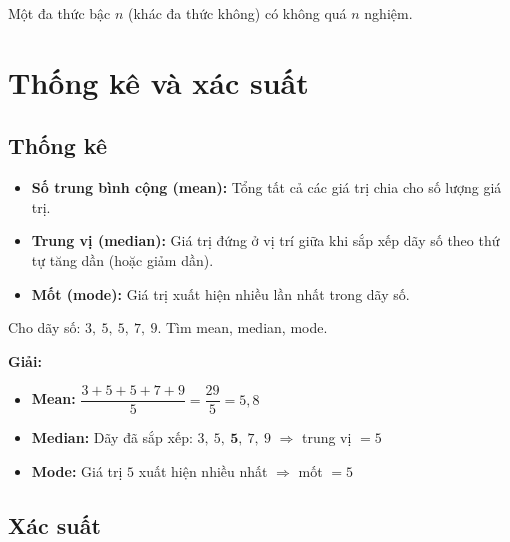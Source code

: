 \documentclass[12pt,a4paper]{article}
\begin{document}
\begin{luuy}
Một đa thức bậc $n$ (khác đa thức không) có không quá $n$ nghiệm.
\end{luuy}

\section{Thống kê và xác suất}

\subsection{Thống kê}

\begin{dinhnghia}
\begin{itemize}
  \item \textbf{Số trung bình cộng (mean):} Tổng tất cả các giá trị chia cho số lượng giá trị.
  \item \textbf{Trung vị (median):} Giá trị đứng ở vị trí giữa khi sắp xếp dãy số theo thứ tự tăng dần (hoặc giảm dần).
  \item \textbf{Mốt (mode):} Giá trị xuất hiện nhiều lần nhất trong dãy số.
\end{itemize}
\end{dinhnghia}

\begin{vidu}
Cho dãy số: $3,\ 5,\ 5,\ 7,\ 9$. Tìm mean, median, mode.

\textbf{Giải:}
\begin{itemize}
  \item \textbf{Mean:} $\dfrac{3 + 5 + 5 + 7 + 9}{5} = \dfrac{29}{5} = 5{,}8$
  \item \textbf{Median:} Dãy đã sắp xếp: $3,\ 5,\ \mathbf{5},\ 7,\ 9$ $\Rightarrow$ trung vị $= 5$
  \item \textbf{Mode:} Giá trị $5$ xuất hiện nhiều nhất $\Rightarrow$ mốt $= 5$
\end{itemize}
\end{vidu}

\subsection{Xác suất}
\end{document}
